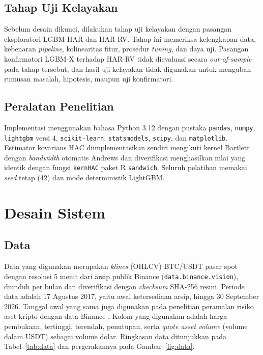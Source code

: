 \subsection{Tahap Uji Kelayakan}
Sebelum desain dikunci, dilakukan tahap uji kelayakan dengan pasangan
eksploratori LGBM-HAR dan HAR-RV. Tahap ini memeriksa kelengkapan data,
kebenaran \textit{pipeline}, kolinearitas fitur, prosedur \textit{tuning}, dan
daya uji. Pasangan konfirmatori LGBM-X terhadap HAR-RV tidak dievaluasi secara
\textit{out-of-sample} pada tahap tersebut, dan hasil uji kelayakan tidak
digunakan untuk mengubah rumusan masalah, hipotesis, maupun uji konfirmatori.


\subsection{Peralatan Penelitian}
\label{subsec:peralatan}
Implementasi menggunakan bahasa Python 3.12 dengan pustaka \texttt{pandas},
\texttt{numpy}, \texttt{lightgbm} versi 4, \texttt{scikit-learn},
\texttt{statsmodels}, \texttt{scipy}, dan \texttt{matplotlib}. Estimator
kovarians HAC diimplementasikan sendiri mengikuti kernel Bartlett dengan
\textit{bandwidth} otomatis Andrews \cite{andrews1991} dan diverifikasi
menghasilkan nilai yang identik dengan fungsi \texttt{kernHAC} paket R
\texttt{sandwich}. Seluruh pelatihan memakai \textit{seed} tetap (42) dan mode
deterministik LightGBM.


\section{Desain Sistem}

\subsection{Data}
\label{subsec:data}
Data yang digunakan merupakan \textit{klines} (OHLCV) BTC/USDT pasar spot dengan
resolusi 5 menit dari arsip publik Binance (\texttt{data.binance.vision}),
diunduh per bulan dan diverifikasi dengan \textit{checksum} SHA-256 resmi.
Periode data adalah 17 Agustus 2017, yaitu awal ketersediaan arsip, hingga
30 September 2026. Tanggal awal yang sama juga digunakan pada penelitian
peramalan risiko aset kripto dengan data Binance \cite{trucios2023}. Kolom
yang digunakan adalah harga pembukaan, tertinggi,
terendah, penutupan, serta \textit{quote asset volume} (volume dalam USDT)
sebagai volume dolar. Ringkasan data ditunjukkan pada Tabel~\ref{tab:data} dan
pergerakannya pada Gambar~\ref{fig:data}.

